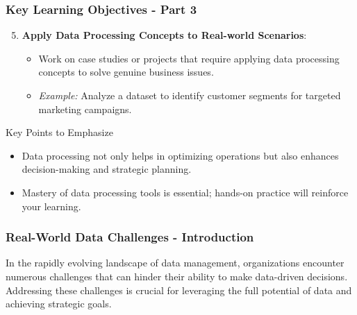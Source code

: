 \documentclass{beamer}
\begin{document}
\begin{frame}
    \frametitle{Key Learning Objectives - Part 3}
    \begin{enumerate}
        \setcounter{enumi}{4} %
        \item \textbf{Apply Data Processing Concepts to Real-world Scenarios}:
            \begin{itemize}
                \item Work on case studies or projects that require applying data processing concepts to solve genuine business issues.
                \item \textit{Example:} Analyze a dataset to identify customer segments for targeted marketing campaigns.
            \end{itemize}
    \end{enumerate}
    \begin{block}{Key Points to Emphasize}
        \begin{itemize}
            \item Data processing not only helps in optimizing operations but also enhances decision-making and strategic planning.
            \item Mastery of data processing tools is essential; hands-on practice will reinforce your learning.
        \end{itemize}
    \end{block}
\end{frame}

\begin{frame}[fragile]
    \frametitle{Real-World Data Challenges - Introduction}
    In the rapidly evolving landscape of data management, organizations encounter numerous challenges that can hinder their ability to make data-driven decisions. Addressing these challenges is crucial for leveraging the full potential of data and achieving strategic goals.
\end{frame}
\end{document}
